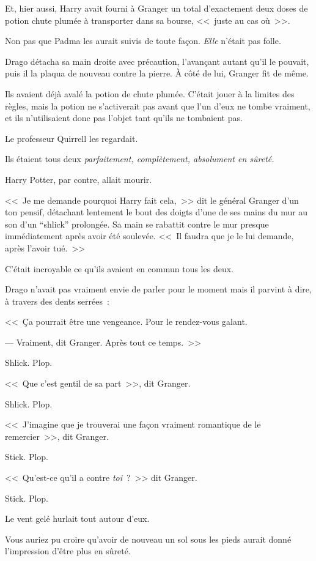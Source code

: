 Et, hier aussi, Harry avait fourni à Granger un total d'exactement deux doses de potion chute plumée à transporter dans sa bourse, <<~juste au cas où~>>.

Non pas que Padma les aurait suivis de toute façon. \emph{Elle} n'était pas folle.

Drago détacha sa main droite avec précaution, l'avançant autant qu'il le pouvait, puis il la plaqua de nouveau contre la pierre. À côté de lui, Granger fit de même.

Ils avaient déjà avalé la potion de chute plumée. C'était jouer à la limites des règles, mais la potion ne s'activerait pas avant que l'un d'eux ne tombe vraiment, et ils n'utilisaient donc pas l'objet tant qu'ils ne tombaient pas.

Le professeur Quirrell les regardait.

Ils étaient tous deux \emph{parfaitement, complètement, absolument en sûreté.}

Harry Potter, par contre, allait mourir.

<<~Je me demande pourquoi Harry fait cela,~>> dit le général Granger d'un ton pensif, détachant lentement le bout des doigts d'une de ses mains du mur au son d'un “shlick” prolongée. Sa main se rabattit contre le mur presque immédiatement après avoir été soulevée. <<~Il faudra que je le lui demande, après l'avoir tué.~>>

C'était incroyable ce qu'ils avaient en commun tous les deux.

Drago n'avait pas vraiment envie de parler pour le moment mais il parvint à dire, à travers des dents serrées~:

<<~Ça pourrait être une vengeance. Pour le rendez-vous galant.

--- Vraiment, dit Granger. Après tout ce temps.~>>

Shlick. Plop.

<<~Que c'est gentil de sa part~>>, dit Granger.

Shlick. Plop.

<<~J'imagine que je trouverai une façon vraiment romantique de le remercier~>>, dit Granger.

Stick. Plop.

<<~Qu'est-ce qu'il a contre \emph{toi}~?~>> dit Granger.

Stick. Plop.

Le vent gelé hurlait tout autour d'eux.

\later

Vous auriez pu croire qu'avoir de nouveau un sol sous les pieds aurait donné l'impression d'être plus en sûreté.

